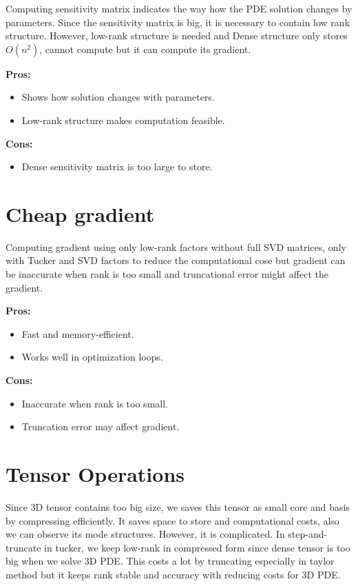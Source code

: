 \documentclass{article}
\begin{document}
Computing sensitivity matrix indicates the way how the PDE solution changes by parameters. Since the sensitivity matrix is big, it is necessary to contain low rank structure. However, low-rank structure is needed and Dense structure only stores $O(n^2)$, cannot compute but it can compute its gradient.

\textbf{Pros:}
\begin{itemize}
    \item Shows how solution changes with parameters.
    \item Low-rank structure makes computation feasible.
\end{itemize}

\textbf{Cons:}
\begin{itemize}
    \item Dense sensitivity matrix is too large to store.
\end{itemize}
\section*{Cheap gradient}

Computing gradient using only low-rank factors without full SVD matrices, only with Tucker and SVD factors to reduce the computational cose but gradient can be inaccurate when rank is too small and truncational error might affect the gradient.

\textbf{Pros:}
\begin{itemize}
    \item Fast and memory-efficient.
    \item Works well in optimization loops.
\end{itemize}

\textbf{Cons:}
\begin{itemize}
    \item Inaccurate when rank is too small.
    \item Truncation error may affect gradient.
\end{itemize}

\section*{Tensor Operations}

Since 3D tensor contains too big size, we saves this tensor as small core and basis by compressing efficiently. It saves space to store and computational costs, also we can observe its mode structures. However, it is complicated. In step-and-truncate in tucker, we keep low-rank in compressed form since dense tensor is too big when we solve 3D PDE. This costs a lot by truncating especially in taylor method but it keeps rank stable and accuracy with reducing costs for 3D PDE.
\end{document}
